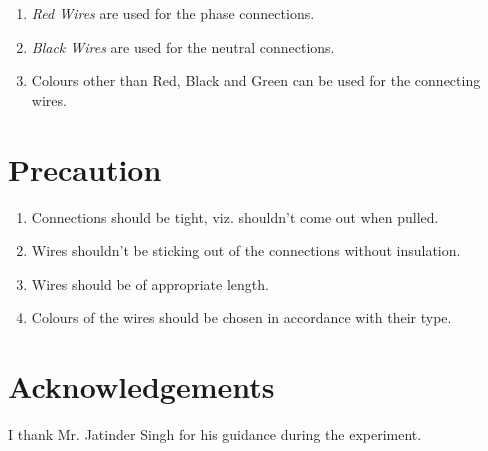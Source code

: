 \begin{enumerate}
			\begin{enumerate}
				\item \emph{Red Wires} are used for the phase connections.
				\item \emph{Black Wires} are used for the neutral connections.
				\item Colours other than Red, Black and Green can be used for the connecting wires.
			\end{enumerate}	
	\end{enumerate}
\section{Precaution}
	\begin{enumerate}
		\item Connections should be tight, viz. shouldn't come out when pulled.
		\item Wires shouldn't be sticking out of the connections without insulation.
		\item Wires should be of appropriate length.
		\item Colours of the wires should be chosen in accordance with their type.
	\end{enumerate}	
\section{Acknowledgements}
I thank Mr. Jatinder Singh for his guidance during the experiment.